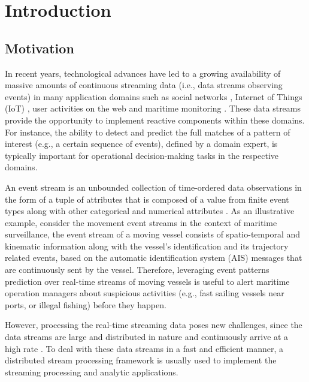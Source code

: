 \chapter{Introduction}


\section{Motivation}
\par In recent years, technological advances have led to a growing availability of massive amounts of continuous streaming data (i.e., data streams observing events) in many application domains such as social networks \cite{reuter2012event,mathioudakis2010twittermonitor}, Internet of Things (IoT) \cite{miorandi2012internet}, user activities on the web \cite{banerjee2001clickstream,metwally2005duplicate} and maritime monitoring \cite{patroumpas2015event,laxhammar2010conformal}. These data streams provide the opportunity to implement reactive components within these domains.  For instance, the ability to detect and predict the full matches of a pattern of interest (e.g., a certain sequence of events), defined by a domain expert, is typically important for operational decision-making tasks in the respective domains.

\par An event stream is an unbounded collection of time-ordered data observations in the form of a tuple of attributes that is composed of a value from finite event types along with other categorical and numerical attributes \cite{agrawal2008efficient,schultz2009distributed,zhou_pattern_2015}. As an illustrative example, consider the movement event streams in the context of maritime surveillance, the event stream of a moving vessel consists of spatio-temporal and kinematic information along with the vessel's identification and its trajectory related events, based on the automatic identification system (AIS) \cite{ais} messages that are continuously sent by the vessel. Therefore, leveraging event patterns prediction over real-time streams of moving vessels is useful to alert maritime operation managers about suspicious activities (e.g., fast sailing vessels near ports, or illegal fishing) before they happen. 

\par However, processing the real-time streaming data poses new challenges, since the data streams are large and distributed in nature and continuously arrive at a high rate \cite{Babcock2002,Flouris2017}. To deal with these data streams in a fast and efficient manner, a distributed stream processing framework \cite{Spark,Flink,Storm} is usually used to implement the streaming processing and analytic applications. 


